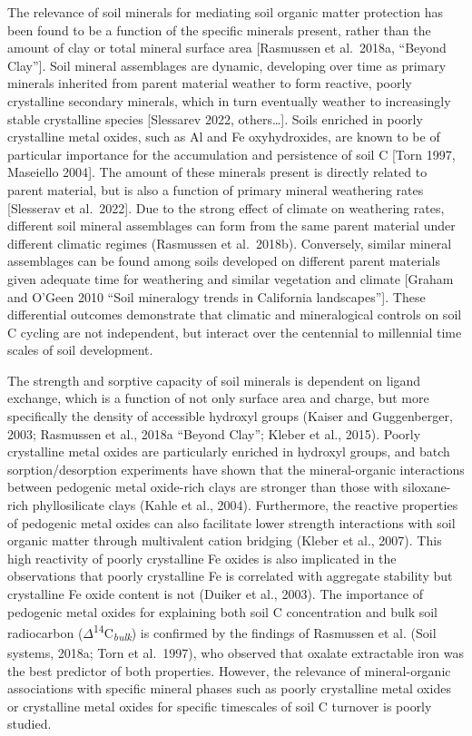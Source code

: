 \documentclass[english,man,floatsintext]{apa6}
\begin{document}
The relevance of soil minerals for mediating soil organic matter protection has been found to be a function of the specific minerals present, rather than the amount of clay or total mineral surface area {[}Rasmussen et al.~2018a, \enquote{Beyond Clay}{]}. Soil mineral assemblages are dynamic, developing over time as primary minerals inherited from parent material weather to form reactive, poorly crystalline secondary minerals, which in turn eventually weather to increasingly stable crystalline species {[}Slessarev 2022, others\ldots{}{]}. Soils enriched in poorly crystalline metal oxides, such as Al and Fe oxyhydroxides, are known to be of particular importance for the accumulation and persistence of soil C {[}Torn 1997, Maseiello 2004{]}. The amount of these minerals present is directly related to parent material, but is also a function of primary mineral weathering rates {[}Slesserav et al.~2022{]}. Due to the strong effect of climate on weathering rates, different soil mineral assemblages can form from the same parent material under different climatic regimes (Rasmussen et al.~2018b). Conversely, similar mineral assemblages can be found among soils developed on different parent materials given adequate time for weathering and similar vegetation and climate {[}Graham and O'Geen 2010 \enquote{Soil mineralogy trends in California landscapes}{]}. These differential outcomes demonstrate that climatic and mineralogical controls on soil C cycling are not independent, but interact over the centennial to millennial time scales of soil development.

The strength and sorptive capacity of soil minerals is dependent on ligand exchange, which is a function of not only surface area and charge, but more specifically the density of accessible hydroxyl groups (Kaiser and Guggenberger, 2003; Rasmussen et al., 2018a \enquote{Beyond Clay}; Kleber et al., 2015). Poorly crystalline metal oxides are particularly enriched in hydroxyl groups, and batch sorption/desorption experiments have shown that the mineral-organic interactions between pedogenic metal oxide-rich clays are stronger than those with siloxane-rich phyllosilicate clays (Kahle et al., 2004). Furthermore, the reactive properties of pedogenic metal oxides can also facilitate lower strength interactions with soil organic matter through multivalent cation bridging (Kleber et al., 2007). This high reactivity of poorly crystalline Fe oxides is also implicated in the observations that poorly crystalline Fe is correlated with aggregate stability but crystalline Fe oxide content is not (Duiker et al., 2003). The importance of pedogenic metal oxides for explaining both soil C concentration and bulk soil radiocarbon (\(\Delta\)\textsuperscript{14}C\textsubscript{\emph{bulk}}) is confirmed by the findings of Rasmussen et al. (Soil systems, 2018a; Torn et al.~1997), who observed that oxalate extractable iron was the best predictor of both properties. However, the relevance of mineral-organic associations with specific mineral phases such as poorly crystalline metal oxides or crystalline metal oxides for specific timescales of soil C turnover is poorly studied.
\end{document}
